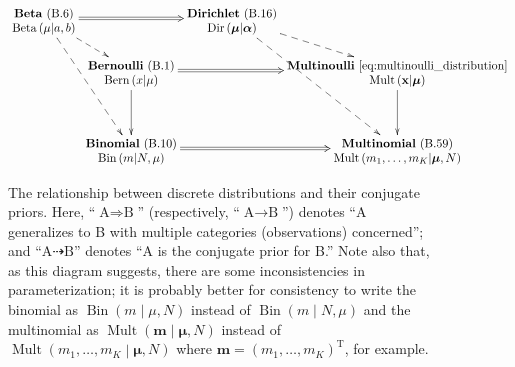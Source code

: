 \documentclass[12pt,a4paper]{article}
\begin{document}
\begin{figure}
\centering
{\fontfamily{\sfdefault}\selectfont
\begin{equation*}
\xymatrix@R-2ex@C-5ex{
\txt{\textbf{Beta}~(B.6) \\
$\operatorname{Beta}\left(\mu\middle|a, b\right)$}
\ar@2[rr]
\ar@{-->}[dr]
\ar@{-->}[dddr]
&
&
\txt{\textbf{Dirichlet}~(B.16) \\
$\operatorname{Dir}\left(\bm{\mu}\middle|\bm{\alpha}\right)$}
\ar@{-->}[dr]
\ar@{-->}[dddr]
\\
&
\txt{\textbf{Bernoulli}~(B.1) \\
$\operatorname{Bern}\left(x\middle|\mu\right)$}
\ar[dd]
\ar@2[rr]
&
&
\txt{\textbf{Multinoulli}~\eqref{eq:multinoulli_distribution} \\
$\operatorname{Mult}\left(\mathbf{x}\middle|\bm{\mu}\right)$}
\ar[dd]
\\
\\
&
\txt{\textbf{Binomial}~(B.10) \\
$\operatorname{Bin}\left(m\middle|N, \mu\right)$}
\ar@2[rr]
&
&
\txt{\textbf{Multinomial}~(B.59) \\
$\operatorname{Mult}\left(m_1, \dots, m_K\middle|\bm{\mu}, N\right)$}
}
\end{equation*}}
\caption{The relationship between discrete distributions and their conjugate priors.
Here, ``$\text{A} \Rightarrow \text{B}$'' (respectively, ``$\text{A} \rightarrow \text{B}$'')
denotes ``A generalizes to B with multiple categories (observations) concerned''; and
``$\text{A} \dashrightarrow \text{B}$'' denotes ``A is the conjugate prior for B.''
Note also that, as this diagram suggests, there are some inconsistencies in parameterization;
it is probably better for consistency to write the binomial as
$\operatorname{Bin}\left(m\middle|\mu, N\right)$ instead of
$\operatorname{Bin}\left(m\middle|N, \mu\right)$
and the multinomial as
$\operatorname{Mult}\left(\mathbf{m}\middle|\bm{\mu}, N\right)$ instead of
$\operatorname{Mult}\left(m_1, \dots, m_K\middle|\bm{\mu}, N\right)$
where $\mathbf{m} = \left(m_1, \dots, m_K\right)^{\operatorname{T}}$,
for example.}
\label{fig:relationship_between_discrete_distributions}
\end{figure}
\end{document}

